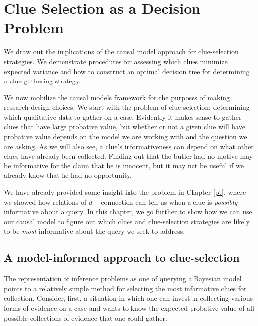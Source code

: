 \documentclass[
  12pt,
]{book}
\newenvironment{headerbox}{
  \definecolor{shadecolor}{rgb}{0.8, 0.8, 0.8}  %
  \color{black}
  \begin{shaded}}{\end{shaded}}
\begin{document}
\hypertarget{clue}{%
\chapter{Clue Selection as a Decision Problem}\label{clue}}

\begin{headerbox}
We draw out the implications of the causal model approach for clue-selection strategies. We demonstrate procedures for assessing which clues minimize expected variance and how to construct an optimal decision tree for determining a clue gathering strategy.

\end{headerbox}

We now mobilize the causal models framework for the purposes of making research-design choices. We start with the problem of clue-selection: determining which qualitative data to gather on a case. Evidently it makes sense to gather clues that have large probative value, but whether or not a given clue will have probative value depends on the model we are working with and the question we are asking. As we will also see, a clue's informativeness can depend on what other clues have already been collected. Finding out that the butler had no motive may be informative for the claim that he is innocent, but it may not be useful if we already know that he had no opportunity.

We have already provided some insight into the problem in Chapter \ref{pt}, where we showed how relations of \(d-\)connection can tell us when a clue is \emph{possibly} informative about a query. In this chapter, we go further to show how we can use our causal model to figure out which clues and clue-selection strategies are likely to be \emph{most} informative about the query we seek to address.

\hypertarget{a-model-informed-approach-to-clue-selection}{%
\section{A model-informed approach to clue-selection}\label{a-model-informed-approach-to-clue-selection}}

The representation of inference problems as one of querying a Bayesian model points to a relatively simple method for selecting the most informative clues for collection. Consider, first, a situation in which one can invest in collecting various forms of evidence on a case and wants to know the expected probative value of all possible collections of evidence that one could gather.
\end{document}
